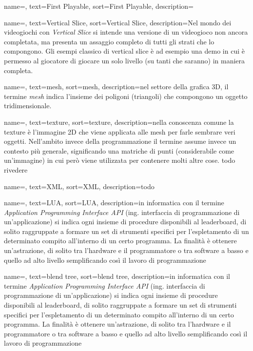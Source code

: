 {
	name=,
	text=First Playable,
	sort=First Playable,
	description={}
}

{
	name=,
	text=Vertical Slice,
	sort=Vertical Slice,
	description={Nel mondo dei videogiochi con \emph{Vertical Slice} si intende una versione di un videogioco non ancora completata, ma presenta un assaggio completo di tutti gli strati che lo compongono. Gli esempi classico di vertical slice è ad esempio una demo in cui è permesso al giocatore di giocare un solo livello (su tanti che saranno) in maniera completa.}
}

{
	name=,
	text=mesh,
	sort=mesh,
	description={nel settore della grafica 3D, il termine \emph{mesh} indica l'insieme dei poligoni (triangoli) che compongono un oggetto tridimensionale.}
}

{
	name=,
	text=texture,
	sort=texture,
	description={nella conoscenza comune la texture è l'immagine 2D che viene applicata alle mesh per farle sembrare veri oggetti. Nell'ambito invece della programmazione il termine assume invece un contesto più generale, significando una matriche di punti (considerabile come un'immagine) in cui però viene utilizzata per contenere molti altre cose. todo rivedere}
}

{
	name=,
	text=XML,
	sort=XML,
	description={todo}
}

{
	name=,
	text=LUA,
	sort=LUA,
	description={in informatica con il termine \emph{Application Programming Interface API} (ing. interfaccia di programmazione di un'applicazione) si indica ogni insieme di procedure disponibili al leaderboard, di solito raggruppate a formare un set di strumenti specifici per l'espletamento di un determinato compito all'interno di un certo programma. La finalità è ottenere un'astrazione, di solito tra l'hardware e il programmatore o tra software a basso e quello ad alto livello semplificando così il lavoro di programmazione}
}

{
	name=,
	text=blend tree,
	sort=blend tree,
	description={in informatica con il termine \emph{Application Programming Interface API} (ing. interfaccia di programmazione di un'applicazione) si indica ogni insieme di procedure disponibili al leaderboard, di solito raggruppate a formare un set di strumenti specifici per l'espletamento di un determinato compito all'interno di un certo programma. La finalità è ottenere un'astrazione, di solito tra l'hardware e il programmatore o tra software a basso e quello ad alto livello semplificando così il lavoro di programmazione}
}

